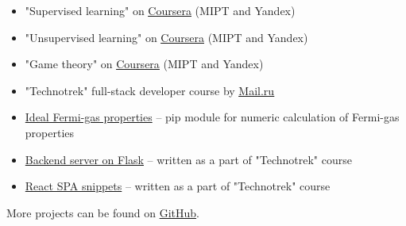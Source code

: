 
\begin{itemize}
	\item "Supervised learning" on \href{https://www.coursera.org/learn/supervised-learning?specialization=machine-learning-data-analysis}{\underline{Coursera}} (MIPT and Yandex)
	\item "Unsupervised learning" on \href{https://www.coursera.org/learn/unsupervised-learning?specialization=machine-learning-data-analysis}{\underline{Coursera}} (MIPT and Yandex)
	\item "Game theory" on \href{https://www.coursera.org/learn/gametheory}{\underline{Coursera}} (MIPT and Yandex)
	\item "Technotrek" full-stack developer course by \href{https://track.mail.ru/}{\underline{Mail.ru}}
\end{itemize}


\begin{itemize}
    \item \href{https://github.com/alekseik1/ifg-py}{Ideal Fermi-gas properties} -- pip module for numeric calculation of Fermi-gas properties
    \item \href{https://github.com/alekseik1/tt-ridesharing-backend}{Backend server on Flask} -- written as a part of "Technotrek" course
    \item \href{https://github.com/alekseik1/2018-FS-11-Frontend-Kozharin}{React SPA snippets} -- written as a part of "Technotrek" course
\end{itemize}
More projects can be found on \href{https://github.com/alekseik1/}{GitHub}.

